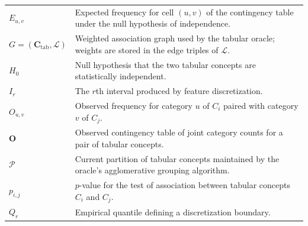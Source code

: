 \begin{longtable}{@{}>{\raggedright\arraybackslash}p{} p{}@{}}
	$E_{u,v}$                                          & Expected frequency for cell $(u,v)$ of the contingency table under the null hypothesis of independence.                                                                                                            \\
	$G=(\mathbf{C}_{\mathrm{tab}},\mathcal{L})$        & Weighted association graph used by the tabular oracle; weights are stored in the edge triples of $\mathcal{L}$.                                                                                                    \\
	$H_0$                                              & Null hypothesis that the two tabular concepts are statistically independent.                                                                                                                                       \\
	$I_r$                                              & The $r$th interval produced by feature discretization.                                                                                                                                                             \\
	$O_{u,v}$                                          & Observed frequency for category $u$ of $C_i$ paired with category $v$ of $C_j$.                                                                                                                                    \\
	$\mathbf{O}$                                       & Observed contingency table of joint category counts for a pair of tabular concepts.                                                                                                                                \\
	$\mathcal{P}$                                      & Current partition of tabular concepts maintained by the oracle's agglomerative grouping algorithm.                                                                                                                 \\
	$p_{i,j}$                                          & $p$-value for the test of association between tabular concepts $C_i$ and $C_j$.                                                                                                                                    \\
	$Q_r$                                              & Empirical quantile defining a discretization boundary.                                                                                                                                                             \\

\end{longtable}
